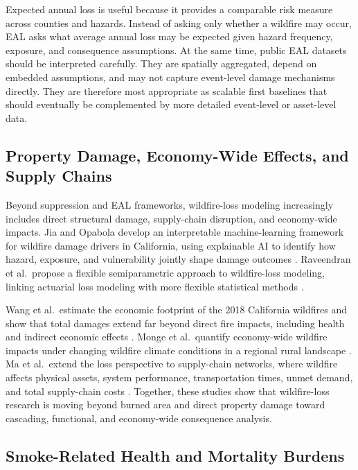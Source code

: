 Expected annual loss is useful because it provides a comparable risk measure across counties and hazards. Instead of asking only whether a wildfire may occur, EAL asks what average annual loss may be expected given hazard frequency, exposure, and consequence assumptions. At the same time, public EAL datasets should be interpreted carefully. They are spatially aggregated, depend on embedded assumptions, and may not capture event-level damage mechanisms directly. They are therefore most appropriate as scalable first baselines that should eventually be complemented by more detailed event-level or asset-level data.

\subsection{Property Damage, Economy-Wide Effects, and Supply Chains}

Beyond suppression and EAL frameworks, wildfire-loss modeling increasingly includes direct structural damage, supply-chain disruption, and economy-wide impacts. Jia and Opabola develop an interpretable machine-learning framework for wildfire damage drivers in California, using explainable AI to identify how hazard, exposure, and vulnerability jointly shape damage outcomes \citep{jia2025interpretable}. Raveendran et al.\ propose a flexible semiparametric approach to wildfire-loss modeling, linking actuarial loss modeling with more flexible statistical methods \citep{raveendran2025wildfireloss}.

Wang et al.\ estimate the economic footprint of the 2018 California wildfires and show that total damages extend far beyond direct fire impacts, including health and indirect economic effects \citep{wang2021economicfootprint}. Monge et al.\ quantify economy-wide wildfire impacts under changing wildfire climate conditions in a regional rural landscape \citep{monge2023probabilistic}. Ma et al.\ extend the loss perspective to supply-chain networks, where wildfire affects physical assets, system performance, transportation times, unmet demand, and total supply-chain costs \citep{ma2022supplychain}. Together, these studies show that wildfire-loss research is moving beyond burned area and direct property damage toward cascading, functional, and economy-wide consequence analysis.

\subsection{Smoke-Related Health and Mortality Burdens}

